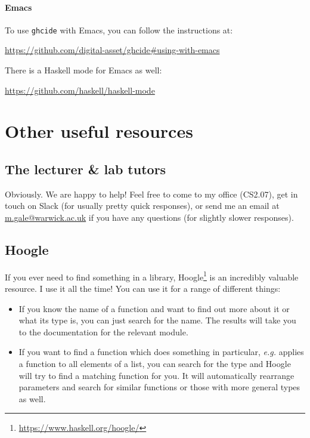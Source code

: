 \paragraph{Emacs} To use \texttt{\small ghcide} with Emacs, you can follow the instructions at:
\begin{center}\small
	\parbox{13cm}{\centering\url{https://github.com/digital-asset/ghcide\#using-with-emacs}}
\end{center}
There is a Haskell mode for Emacs as well:
\begin{center} \small
\url{https://github.com/haskell/haskell-mode}
\end{center}

\section{Other useful resources}

\subsection{The lecturer \& lab tutors} 

Obviously. We are happy to help! Feel free to come to my office (CS2.07), get in touch on Slack (for usually pretty quick responses), or send me an email at \href{mailto:m.gale@warwick.ac.uk}{m.gale@warwick.ac.uk} if you have any questions (for slightly slower responses). 

\subsection{Hoogle} 

If you ever need to find something in a library, Hoogle\footnote{\url{https://www.haskell.org/hoogle/}} is an incredibly valuable resource. I use it all the time! You can use it for a range of different things:
\begin{itemize}
\item If you know the name of a function and want to find out more about it or what its type is, you can just search for the name. The results will take you to the documentation for the relevant module.
\item If you want to find a function which does something in particular, \emph{e.g.} applies a function to all elements of a list, you can search for the type and Hoogle will try to find a matching function for you. It will automatically rearrange parameters and search for similar functions or those with more general types as well. 
\end{itemize}

